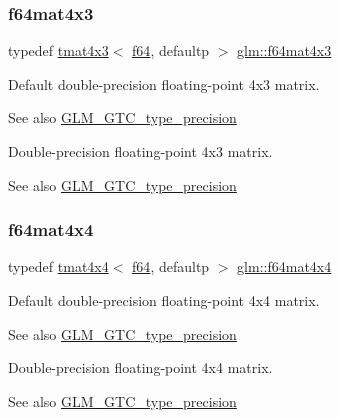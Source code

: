 \subsubsection{\texorpdfstring{f64mat4x3}{f64mat4x3}}
{\footnotesize\ttfamily typedef \hyperlink{structglm_1_1tmat4x3}{tmat4x3}$<$ \hyperlink{group__gtc__type__precision_ga2bba392e555124b36cde6abba349bab3}{f64}, defaultp $>$ \hyperlink{group__gtc__type__precision_gab10a195a85f65da47bf70438f57a8a3c}{glm\+::f64mat4x3}}

Default double-\/precision floating-\/point 4x3 matrix. \begin{DoxySeeAlso}{See also}
\hyperlink{group__gtc__type__precision}{G\+L\+M\+\_\+\+G\+T\+C\+\_\+type\+\_\+precision}
\end{DoxySeeAlso}
Double-\/precision floating-\/point 4x3 matrix. \begin{DoxySeeAlso}{See also}
\hyperlink{group__gtc__type__precision}{G\+L\+M\+\_\+\+G\+T\+C\+\_\+type\+\_\+precision} 
\end{DoxySeeAlso}
\mbox{\label{group__gtc__type__precision_ga6b1ada50de2fc7d991138ab857fb2476}} 
\subsubsection{\texorpdfstring{f64mat4x4}{f64mat4x4}}
{\footnotesize\ttfamily typedef \hyperlink{structglm_1_1tmat4x4}{tmat4x4}$<$ \hyperlink{group__gtc__type__precision_ga2bba392e555124b36cde6abba349bab3}{f64}, defaultp $>$ \hyperlink{group__gtc__type__precision_ga6b1ada50de2fc7d991138ab857fb2476}{glm\+::f64mat4x4}}

Default double-\/precision floating-\/point 4x4 matrix. \begin{DoxySeeAlso}{See also}
\hyperlink{group__gtc__type__precision}{G\+L\+M\+\_\+\+G\+T\+C\+\_\+type\+\_\+precision}
\end{DoxySeeAlso}
Double-\/precision floating-\/point 4x4 matrix. \begin{DoxySeeAlso}{See also}
\hyperlink{group__gtc__type__precision}{G\+L\+M\+\_\+\+G\+T\+C\+\_\+type\+\_\+precision} 
\end{DoxySeeAlso}
\mbox{\label{group__gtc__type__precision_ga5b54d7b36fbee5e271f73e6ed74e7172}} 
